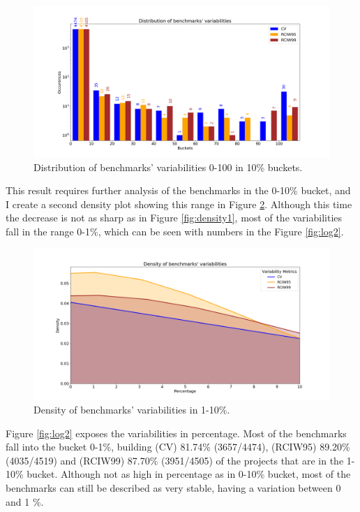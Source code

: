 \documentclass{seal_thesis}
\begin{document}
\begin{figure}[H]
	\centering
	\includegraphics[width=\linewidth]{resultsvis/log1}
	\caption{Distribution of benchmarks' variabilities 0-100 in 10\% buckets.}
	\label{fig:log1}
\end{figure}

\noindent This result requires further analysis of the benchmarks in the 0-10\% bucket, and I create a second density plot showing this range in Figure \ref{fig:density2}. Although this time the decrease is not as sharp as in Figure \ref{fig:density1}, most of the variabilities fall in the range 0-1\%, which can be seen with numbers in the Figure \ref{fig:log2}.

\begin{figure}[H]
	\centering
	\includegraphics[width=\linewidth]{resultsvis/density_controlled2}
	\caption{Density of benchmarks' variabilities in 1-10\%.}
	\label{fig:density2}
\end{figure}

\noindent Figure \ref{fig:log2} exposes the variabilities in percentage. Most of the benchmarks fall into the bucket 0-1\%, building (CV) 81.74\% (3657/4474), (RCIW95) 89.20\% (4035/4519) and (RCIW99) 87.70\% (3951/4505) of the projects that are in the 1-10\% bucket. Although not as high in percentage as in 0-10\% bucket, most of the benchmarks can still be described as very stable, having a variation between 0 and 1 \%.
\end{document}
